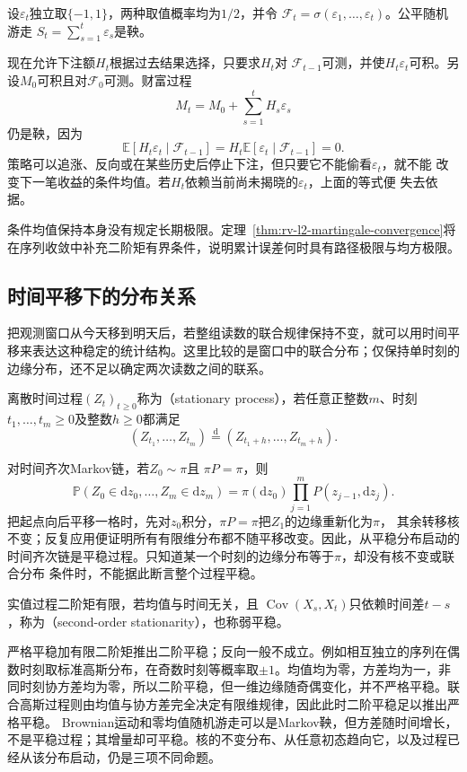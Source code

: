 \begin{example}[公平随机游走与按过去下注]
  \label{ex:stoch-predictable-betting}
  设$\varepsilon_t$独立取$\{-1,1\}$，两种取值概率均为$1/2$，并令
  $\mathcal{F}_t=\sigma(\varepsilon_1,\ldots,\varepsilon_t)$。公平随机游走
  $S_t=\sum_{s=1}^{t}\varepsilon_s$是鞅。

  现在允许下注额$H_t$根据过去结果选择，只要求$H_t$对
  $\mathcal{F}_{t-1}$可测，并使$H_t\varepsilon_t$可积。另设\(M_0\)可积且对\(\mathcal F_0\)可测。财富过程
  \[
    M_t=M_0+\sum_{s=1}^{t}H_s\varepsilon_s
  \]
  仍是鞅，因为
  \[
    \mathbb{E}[H_t\varepsilon_t\mid\mathcal{F}_{t-1}]
    =
    H_t\mathbb{E}[\varepsilon_t\mid\mathcal{F}_{t-1}]
    =0.
  \]
  策略可以追涨、反向或在某些历史后停止下注，但只要它不能偷看$\varepsilon_t$，就不能
  改变下一笔收益的条件均值。若$H_t$依赖当前尚未揭晓的$\varepsilon_t$，上面的等式便
  失去依据。
\end{example}
条件均值保持本身没有规定长期极限。定理~\ref{thm:rv-l2-martingale-convergence}将在序列收敛中补充二阶矩有界条件，说明累计误差何时具有路径极限与均方极限。

\subsection{时间平移下的分布关系}
\label{sec:rv-stationarity}
把观测窗口从今天移到明天后，若整组读数的联合规律保持不变，就可以用时间平移来表达这种稳定的统计结构。这里比较的是窗口中的联合分布；仅保持单时刻的边缘分布，还不足以确定两次读数之间的联系。
\begin{definition}[平稳过程]
  \label{def:stoch-stationary-process}
  离散时间过程\((Z_t)_{t\geq0}\)称为（stationary process），若任意正整数\(m\)、时刻\(t_1,\ldots,t_m\geq0\)及整数\(h\geq0\)都满足
  \[ (Z_{t_1},\ldots,Z_{t_m})\overset{\mathrm d}{=}(Z_{t_1+h},\ldots,Z_{t_m+h}). \]
\end{definition}
对时间齐次Markov链，若$Z_0\sim\pi$且
$\pi P=\pi$，则
\[
  \mathbb{P}(Z_0\in\mathrm{d}z_0,\ldots,Z_m\in\mathrm{d}z_m)
  =
  \pi(\mathrm{d}z_0)
  \prod_{j=1}^{m}P(z_{j-1},\mathrm{d}z_j).
\]
把起点向后平移一格时，先对$z_0$积分，$\pi P=\pi$把$Z_1$的边缘重新化为$\pi$，
其余转移核不变；反复应用便证明所有有限维分布都不随平移改变。因此，从平稳分布启动的
时间齐次链是平稳过程。只知道某一个时刻的边缘分布等于$\pi$，却没有核不变或联合分布
条件时，不能据此断言整个过程平稳。
\begin{definition}[二阶平稳]
\label{def:rv-second-order-stationary}
实值过程二阶矩有限，若均值与时间无关，且
\(\operatorname{Cov}(X_s,X_t)\)只依赖时间差\(t-s\)，称为（second-order stationarity），也称弱平稳。
\end{definition}
严格平稳加有限二阶矩推出二阶平稳；反向一般不成立。例如相互独立的序列在偶数时刻取标准高斯分布，在奇数时刻等概率取\(\pm1\)。均值均为零，方差均为一，非同时刻协方差均为零，所以二阶平稳，但一维边缘随奇偶变化，并不严格平稳。联合高斯过程则由均值与协方差完全决定有限维规律，因此此时二阶平稳足以推出严格平稳。
Brownian运动和零均值随机游走可以是Markov鞅，但方差随时间增长，不是平稳过程；其增量却可平稳。核的不变分布、从任意初态趋向它，以及过程已经从该分布启动，仍是三项不同命题。

